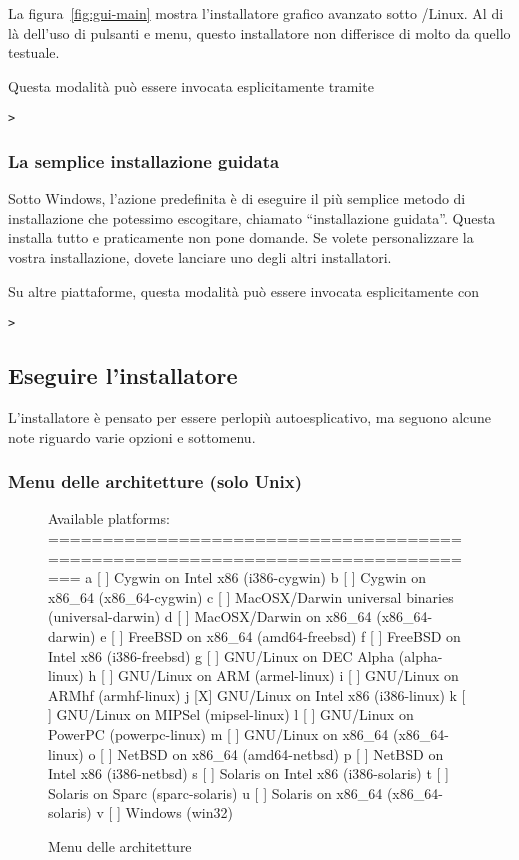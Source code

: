 \documentclass{article}
\begin{document}
La figura~\ref{fig:gui-main} mostra l'installatore grafico avanzato sotto
\GNU/Linux. Al di là dell'uso di pulsanti e menu, questo installatore non
differisce di molto da quello testuale.

Questa modalità può essere invocata esplicitamente tramite
\begin{alltt}
> 
\end{alltt}


\subsubsection{La semplice installazione guidata}

Sotto Windows, l'azione predefinita è di eseguire il più semplice metodo
di installazione che potessimo escogitare, chiamato ``installazione
guidata''. Questa installa tutto e praticamente non pone domande. Se
volete personalizzare la vostra installazione, dovete lanciare uno degli
altri installatori.

Su altre piattaforme, questa modalità può essere invocata esplicitamente con
\begin{alltt}
> 
\end{alltt}


\subsection{Eseguire l'installatore}
\label{sec:runinstall}

L'installatore è pensato per essere perlopiù autoesplicativo, ma seguono
alcune note riguardo varie opzioni e sottomenu.

\subsubsection{Menu delle architetture (solo Unix)}
\label{sec:binary}

\begin{figure}[tb]
\begin{boxedverbatim}
Available platforms:
===============================================================================
   a [ ] Cygwin on Intel x86 (i386-cygwin)
   b [ ] Cygwin on x86_64 (x86_64-cygwin)
   c [ ] MacOSX/Darwin universal binaries (universal-darwin)
   d [ ] MacOSX/Darwin on x86_64 (x86_64-darwin)
   e [ ] FreeBSD on x86_64 (amd64-freebsd)
   f [ ] FreeBSD on Intel x86 (i386-freebsd)
   g [ ] GNU/Linux on DEC Alpha (alpha-linux)
   h [ ] GNU/Linux on ARM (armel-linux)
   i [ ] GNU/Linux on ARMhf (armhf-linux)
   j [X] GNU/Linux on Intel x86 (i386-linux)
   k [ ] GNU/Linux on MIPSel (mipsel-linux)
   l [ ] GNU/Linux on PowerPC (powerpc-linux)
   m [ ] GNU/Linux on x86_64 (x86_64-linux)
   o [ ] NetBSD on x86_64 (amd64-netbsd)
   p [ ] NetBSD on Intel x86 (i386-netbsd)
   s [ ] Solaris on Intel x86 (i386-solaris)
   t [ ] Solaris on Sparc (sparc-solaris)
   u [ ] Solaris on x86_64 (x86_64-solaris)
   v [ ] Windows (win32)
\end{boxedverbatim}
\caption{Menu delle architetture}\label{fig:bin-text}
\end{figure}
\end{document}
